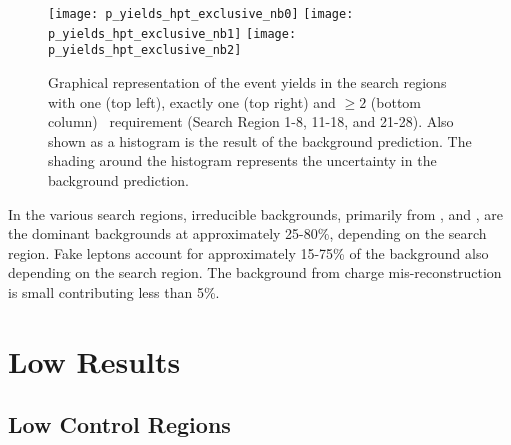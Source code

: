 \begin{figure}[h]
\begin{center}
\texttt{[image: p\_yields\_hpt\_exclusive\_nb0]}
\texttt{[image: p\_yields\_hpt\_exclusive\_nb1]}
\texttt{[image: p\_yields\_hpt\_exclusive\_nb2]}
\caption[Graphical representation of the event yields in the \hpt search regions]
{\label{fig:results_yield_hpt_sr}
Graphical representation of the event yields in the \hpt search regions
with one (top left), exactly one (top right) and $\geq 2$ (bottom column)
\nbtags~requirement (Search Region 1-8, 11-18, and 21-28). Also shown as a histogram
is the result of the background prediction. The shading around the histogram
represents the uncertainty in the background prediction.
}
\end{center}
\end{figure}

In the various search regions, irreducible backgrounds, primarily from \ttW,
\WZ and \qqWW, are the dominant backgrounds at approximately 25-80\%, depending
on the search region. Fake leptons account for approximately 15-75\% of the
background also depending on the search region. The background from charge
mis-reconstruction is small contributing less than 5\%.

\section{Low \pt Results}
\label {sec:results_lpt}

\subsection{Low \pt Control Regions}
\label {sec:results_lpt_bl}

